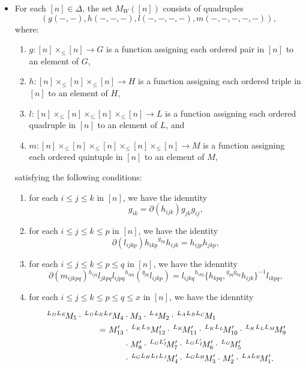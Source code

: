 \documentclass{tac}
\newcommand{\act}[1]{\,\sp{#1}\!}
\renewcommand{\to}{\rightarrow}
\begin{document}
\begin{itemize}
    \item For each $[n] \in \Delta$, the set $M_W([n])$ consists of quadruples 
    \[ (g(-,-), h(-,-,-), l(-,-,-,-),m(-,-,-,-,-)) ,\]
    where:
    \begin{enumerate}
        \item $g: [n] \times_{\le} [n] \to G$ is a function assigning each ordered pair in $[n]$ to an element of $G$,
        \item $h: [n] \times_{\le} [n] \times_{\le} [n] \to H$ is a function assigning each ordered triple in $[n]$ to an element of $H$,  
        \item $l: [n] \times_{\le} [n] \times_{\le} [n] \times_{\le} [n] \to L$ is a function assigning each ordered quadruple in $[n]$ to an element of $L$, and
        \item $m: [n] \times_{\le} [n] \times_{\le} [n] \times_{\le} [n] \times_{\le} [n] \to M$ is a function assigning each ordered quintuple in $[n]$ to an element of $M$,
    \end{enumerate}
    satisfying the following conditions:
    
	
\begin{enumerate}[label=(\alph*)]
\item for each $i \le j \le k$ in $[n]$, we have the idenntity 
\begin{equation}
g_{ik} = \partial(h_{ijk})g_{jk}g_{ij},
\label{r2-simplex m}
\end{equation}
\item for each $i \le j \le k \le p$ in $[n]$, we have the identity 
\begin{equation}
\partial (l_{ijkp})  h_{ikp}{^{g_{kp}}}h_{ijk} = h_{ijp}h_{jkp},
\label{r3-simplex m}
\end{equation}
\item for each $i \le j \le k \le p \le q$ in $[n]$, we have the idenntity 
\begin{equation}
 \partial(m_{ijkpq}) {^{h_{ijq}}}l_{jkpq}l_{ijpq}{^{h_{ipq}}}\left({^{g_{pq}}}l_{ijkp}\right) = l_{ijkq}{^{h_{ikq}}}\{h_{kpq},{^{g_{pq}g_{kq}}}h_{ijk} \}^{-1}l_{ikpq} ,
\label{r4-simplex m}
\end{equation}
\item for each $i \le j \le k  \le p \le q\le x$ in $[n]$, we have the idenntity 

\label{r5-simplex m}
\begin{equation}
\label{r5-simplex m:eq}
\begin{aligned}
   \act{L_D L_E}M_5 \cdot \act{L_D L_E L_F}M_4 &\cdot M_3 \cdot \act{L_A}M_2 \cdot  \act{L_A L_B L_C} M_1\\
   =
   \act{}M'_{13}
   &\cdot \act{L_K L_N}M'_{12}
   \cdot \act{L_K }M'_{11}
   \cdot \act{L_K L_L}M'_{10}
   \cdot \act{L_K L_L L_M}M'_9\\
  & \cdot \act{}M'_8 
   \cdot \act{L_G L'_I}M'_7
   \cdot \act{L_G L'_I}M'_6
   \cdot \act{L_G }M'_5\\
   &\cdot \act{L_G L_H L_I L_J}M'_4
   \cdot \act{L_G L_H}M'_3
   \cdot \act{}M'_2
   \cdot \act{L_A L_B}M'_1.
   \end{aligned}
   \end{equation}


\end{enumerate}
\end{itemize}
\end{document}
